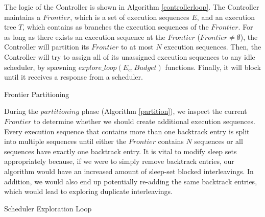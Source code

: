 The logic of the Controller is shown in Algorithm \ref{controllerloop}. The Controller maintains a $Frontier$, 
which is a set of execution sequences $E$, and an execution tree $T$, which contains
as branches the execution sequences of the $Frontier$. For as long as there exists an execution sequence at the $Frontier$ 
($Frontier \neq \emptyset$), the Controller will partition its $Frontier$ to at most $N$ execution sequences. Then, the Controller
will try to assign all of its unassigned execution sequences to any idle scheduler, by spawning $explore\_loop(E_c, Budget)$
functions. Finally, it will block until it receives a response from a scheduler.


\begin{algorithm}
    \caption{Frontier Partitioning}
    \label{partition}
\end{algorithm}

During the $partitioning$ phase (Algorithm \ref{partition}), we inspect the current $Frontier$ to determine whether
we should create additional execution sequences. Every execution sequence that contains more than one backtrack entry
is split into multiple sequences until either the $Frontier$ contains $N$ sequences or all sequences
have exactly one backtrack entry. It is vital to modify sleep sets appropriately because, if we were to simply
remove backtrack entries, our algorithm would have an increased amount of sleep-set blocked interleavings. In addition, we would also 
end up potentially re-adding the same backtrack entries, which would lead
to exploring duplicate interleavings.

\begin{algorithm}
    \caption{Scheduler Exploration Loop}
    \label{explore_loop}
\end{algorithm}

